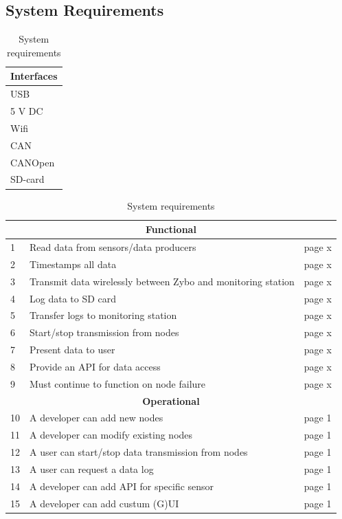 \subsection{System Requirements} %
\label{sec:system_requirements}


\begin{table}[h]
\centering
\caption{System requirements}
\label{tab:requirements}

\begin{tabular}{ |p{3cm}| }
	\hline
	\multicolumn{1}{|c|}{\textbf{Interfaces}}\\
	\hline
	\centering
	USB \\
	5 V DC \\
	Wifi \\
	CAN \\
	CANOpen \\
	SD-card \\
\end{tabular}


\begin{tabular}{ |p{0.3cm}|p{8.5cm}|p{1cm}| }
\hline
\multicolumn{3}{|c|}{\textbf{Functional}}\\
\hline
1 & Read data from sensors/data producers 				& page x \\
2 & Timestamps all data 								& page x \\
3 & Transmit data wirelessly between Zybo and monitoring station	& page x \\
4 & Log data to SD card 								& page x \\
5 & Transfer logs to monitoring station 								& page x \\
6 & Start/stop transmission from nodes 					& page x \\
7 & Present data to user								& page x \\
8 & Provide an API for data access						& page x \\
9 & Must continue to function on node failure			& page x \\

\hline
\multicolumn{3}{|c|}{\textbf{Operational}}\\
\hline	
10 & A developer can add new nodes 						& page 1 \\
11 & A developer can modify existing nodes 				& page 1 \\
12 & A user can start/stop data transmission from nodes	& page 1 \\
13 & A user can request a data log 						& page 1 \\
14 & A developer can add API for specific sensor 		& page 1 \\
15 & A developer can add custum (G)UI					& page 1 \\



\end{tabular}
\end{table}
